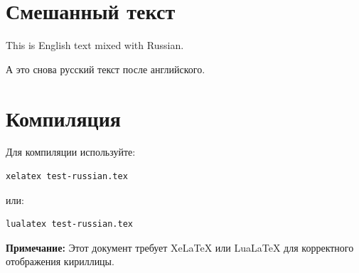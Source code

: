 \documentclass[12pt,a4paper]{article}
\begin{document}
\section{Смешанный текст}
\begin{english}
This is English text mixed with Russian.
\end{english}

А это снова русский текст после английского.

\section{Компиляция}
Для компиляции используйте:
\begin{verbatim}
xelatex test-russian.tex
\end{verbatim}
или:
\begin{verbatim}
lualatex test-russian.tex
\end{verbatim}

\textbf{Примечание:} Этот документ требует XeLaTeX или LuaLaTeX для корректного отображения кириллицы.
\end{document}
